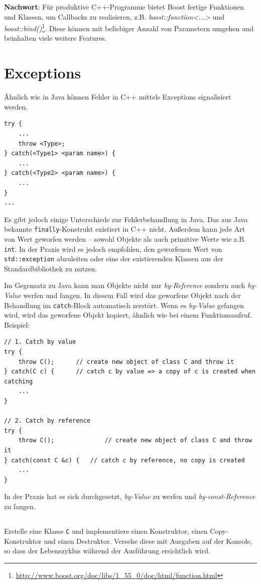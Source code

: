 \textbf{Nachwort}:
Für produktive C++-Programme bietet Boost fertige Funktionen und Klassen, um Callbacks zu realisieren, z.B. \emph{boost::function<...>} und \emph{boost::bind()}\footnote{\url{http://www.boost.org/doc/libs/1_55_0/doc/html/function.html}}. Diese können mit beliebiger Anzahl von Parametern umgehen und beinhalten viele weitere Features.



\newpage

\section{Exceptions}
Ähnlich wie in Java können Fehler in C++ mittels Exceptions signalisiert werden.

\begin{lstlisting}
try {
	...
	throw <Type>;
} catch(<Type1> <param name>) {
	...
} catch(<Type2> <param name>) {
	...
}
...
\end{lstlisting}

Es gibt jedoch einige Unterschiede zur Fehlerbehandlung in Java.
Das aus Java bekannte \texttt{finally}-Konstrukt existiert in C++ nicht.
Außerdem kann jede Art von Wert geworfen werden -- sowohl Objekte als auch primitive Werte wie z.B. \texttt{int}.
In der Praxis wird es jedoch empfohlen, den geworfenen Wert von \texttt{std::exception} abzuleiten oder eine der existierenden Klassen aus der Standardbibliothek zu nutzen.

Im Gegensatz zu Java kann man Objekte nicht nur \emph{by-Reference} sondern auch \emph{by-Value} werfen und fangen. In diesem Fall wird das geworfene Objekt nach der Behandlung im \texttt{catch}-Block automatisch zerstört. Wenn es \emph{by-Value} gefangen wird, wird das geworfene Objekt kopiert, ähnlich wie bei einem Funktionsaufruf. Beispiel:

\begin{lstlisting}
// 1. Catch by value
try {
	throw C();		// create new object of class C and throw it
} catch(C c) {		// catch c by value => a copy of c is created when catching
	...
}

// 2. Catch by reference
try {
	throw C();				// create new object of class C and throw it
} catch(const C &c) {	// catch c by reference, no copy is created
	...
}
\end{lstlisting}

In der Praxis hat es sich durchgesetzt, \emph{by-Value} zu werfen und \emph{by-const-Reference} zu fangen.

\subsection{}
Erstelle eine Klasse \texttt{C} und implementiere einen Konstruktor, einen Copy-Konstruktor und einen Destruktor.
Versehe diese mit Ausgaben auf der Konsole, so dass der Lebenszyklus während der Ausführung ersichtlich wird.

